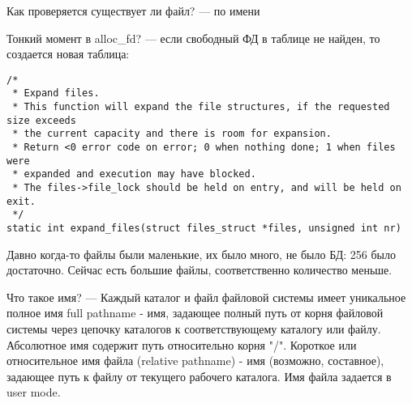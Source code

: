 Как проверяется существует ли файл? --- по имени

Тонкий момент в alloc\_fd? --- если свободный ФД в таблице не найден, то создается новая таблица:

\begin{lstlisting}
/*
 * Expand files.
 * This function will expand the file structures, if the requested size exceeds
 * the current capacity and there is room for expansion.
 * Return <0 error code on error; 0 when nothing done; 1 when files were
 * expanded and execution may have blocked.
 * The files->file_lock should be held on entry, and will be held on exit.
 */
static int expand_files(struct files_struct *files, unsigned int nr)
\end{lstlisting}

Давно когда-то файлы были маленькие, их было много, не было БД: 256 было достаточно. Сейчас есть большие файлы, соответственно количество меньше.

Что такое имя? --- Каждый каталог и файл файловой системы имеет уникальное полное имя full pathname - имя, задающее полный путь от корня файловой системы через цепочку каталогов к соответствующему каталогу или файлу.  Абсолютное имя содержит путь относительно корня "/". Короткое или относительное имя файла (relative pathname) - имя (возможно, составное), задающее путь к файлу от текущего рабочего каталога. Имя файла задается в user mode.




